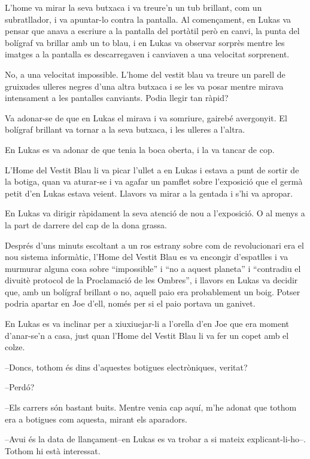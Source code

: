 L'home va mirar la seva butxaca i va treure'n un tub brillant, com un
subratllador, i va apuntar-lo contra la pantalla. Al començament, en
Lukas va pensar que anava a escriure a la pantalla del portàtil però en
canvi, la punta del bolígraf va brillar amb un to blau, i en Lukas va
observar sorprès mentre les imatges a la pantalla es descarregaven i
canviaven a una velocitat sorprenent.

No, a una velocitat impossible. L'home del vestit blau va treure un
parell de gruixudes ulleres negres d'una altra butxaca i se les va posar
mentre mirava intensament a les pantalles canviants. Podia llegir tan
ràpid?

Va adonar-se de que en Lukas el mirava i va somriure, gairebé
avergonyit. El bolígraf brillant va tornar a la seva butxaca, i les
ulleres a l'altra.

En Lukas es va adonar de que tenia la boca oberta, i la va tancar de
cop.

L'Home del Vestit Blau li va picar l'ullet a en Lukas i estava a punt de
sortir de la botiga, quan va aturar-se i va agafar un pamflet sobre
l'exposició que el germà petit d'en Lukas estava veient. Llavors va
mirar a la gentada i s'hi va apropar.

En Lukas va dirigir ràpidament la seva atenció de nou a l'exposició. O
al menys a la part de darrere del cap de la dona grassa.

Després d'uns minuts escoltant a un ros estrany sobre com de
revolucionari era el nou sistema informàtic, l'Home del Vestit Blau es
va encongir d'espatlles i va murmurar alguna cosa sobre ``impossible'' i
``no a aquest planeta'' i ``contradiu el divuitè protocol de la
Proclamació de les Ombres'', i llavors en Lukas va decidir que, amb un
bolígraf brillant o no, aquell paio era probablement un boig. Potser
podria apartar en Joe d'ell, només per si el paio portava un ganivet.

En Lukas es va inclinar per a xiuxiuejar-li a l'orella d'en Joe que era
moment d'anar-se'n a casa, just quan l'Home del Vestit Blau li va fer un
copet amb el colze.

--Doncs, tothom és dins d'aquestes botigues electròniques, veritat?

--Perdó?

--Els carrers són bastant buits. Mentre venia cap aquí, m'he adonat que
tothom era a botigues com aquesta, mirant els aparadors.

--Avui és la data de llançament--en Lukas es va trobar a si mateix
explicant-li-ho--. Tothom hi està interessat.


